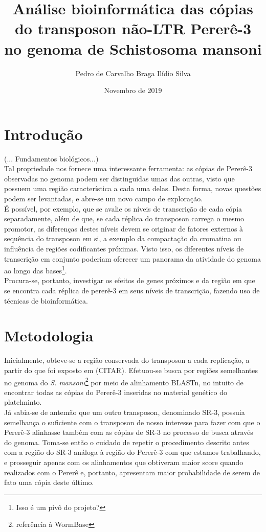 \documentclass{article}
\title{Análise bioinformática das cópias do transposon não-LTR Pererê-3 no genoma de Schistosoma mansoni}
\author{Pedro de Carvalho Braga Ilídio Silva}
\date{Novembro de 2019}
\begin{document}
\maketitle

\begin{multicols}{2}
\section{Introdução}
	(... Fundamentos biológicos...)\\
Tal propriedade nos fornece uma interessante ferramenta: as cópias de Pererê-3 observadas no genoma podem ser distinguidas umas das outras, visto que possuem uma região característica a cada uma delas. Desta forma, novas questões podem ser levantadas, e abre-se um novo campo de exploração.\\

É possível, por exemplo, que se avalie os níveis de transcrição de cada cópia separadamente, além de que, se cada réplica do transposon carrega o mesmo promotor, as diferenças destes níveis devem se originar de fatores externos à sequência do transposon em si, a exemplo da compactação da cromatina ou influência de regiões codificantes próximas. Visto isso, os diferentes níveis de transcrição em conjunto poderiam oferecer um panorama da atividade do genoma ao longo das bases\footnote{Isso é um pivô do projeto?}.\\

Procura-se, portanto, investigar os efeitos de genes próximos e da região em que se encontra cada réplica de pererê-3 em seus níveis de transcrição, fazendo uso de técnicas de bioinformática.

\section{Metodologia}
	Inicialmente, obteve-se a região conservada do transposon a cada replicação, a partir do que foi exposto em (CITAR). Efetuou-se busca por regiões semelhantes no genoma do \textit{S. mansoni}\footnote{referência à WormBase} por meio de alinhamento BLASTn, no intuito de encontrar todas as cópias do Pererê-3 inseridas no material genético do platelminto.\\

	Já sabia-se de antemão que um outro transposon, denominado SR-3, possuia semelhança o suficiente com o transposon de nosso interesse para fazer com que o Pererê-3 alinhasse também com as cópias de SR-3 no processo de busca através do genoma. Toma-se então o cuidado de repetir o procedimento descrito antes com a região do SR-3 análoga à região do Pererê-3 com que estamos trabalhando, e prosseguir apenas com os alinhamentos que obtiveram maior score quando realizados com o Pererê e, portanto, apresentam maior probabilidade de serem de fato uma cópia deste último.\\


\end{multicols}
\end{document}
